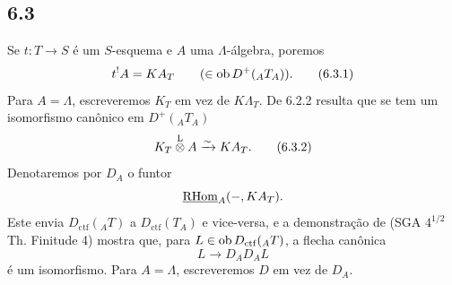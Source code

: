 \subsection*{6.3}
Se $t:T\to S$ é um $S$-esquema e $A$ uma $\Lambda$-álgebra, poremos
\begin{equation}
t^!A = KA_T \qquad(\in\operatorname{ob} D^+({}_AT_A)).
\tag{6.3.1}
\end{equation}
Para $A=\Lambda$, escreveremos $K_T$ em vez de $K\Lambda_T$. De 6.2.2 resulta que se tem um isomorfismo canônico em $D^+({}_AT_A)$
\begin{equation}
K_T\overset{\mathrm L}{\otimes} A\xrightarrow{\sim}KA_T.
\tag{6.3.2}
\end{equation}
Denotaremos por $D_A$ o funtor
\[
\underline{\mathrm{RHom}}_A(-,KA_T).
\]
Este envia $D_{\mathrm{ctf}}({}_AT)$ a $D_{\mathrm{ctf}}(T_A)$ e vice-versa, e a demonstração de (SGA $4^{1/2}$ Th. Finitude 4) mostra que, para $L\in\operatorname{ob} D_{\mathrm{ctf}}({}_AT)$, a flecha canônica
\[
L\longrightarrow D_AD_AL
\]
é um isomorfismo. Para $A=\Lambda$, escreveremos $D$ em vez de $D_A$.
